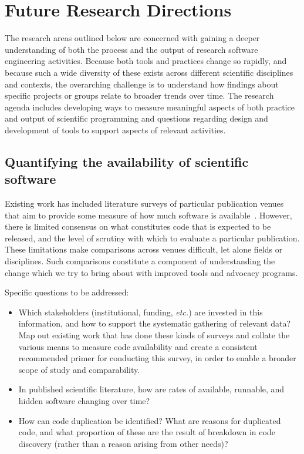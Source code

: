 \documentclass[a4paper,UKenglish]{dagman}
\newcommand{\etc}{\emph{etc.}\xspace}
\begin{document}
\newpage
\section{Future Research Directions}

The research areas outlined below are concerned with gaining a deeper understanding of both the process and the output of research software engineering activities. Because both tools and practices change so rapidly, and because such a wide diversity of these exists across different scientific disciplines and contexts, the overarching challenge is to understand how findings about specific projects or groups relate to broader trends over time. The research agenda includes developing ways to measure meaningful aspects of both practice and output of scientific programming and questions regarding design and development of tools to support aspects of relevant activities.


\subsection{Quantifying the availability of scientific software}

Existing work has included literature surveys of particular publication venues
that aim to provide some measure of how much software is available~\cite{howison_software_2015,duck_survey_2016,momcheva_software_2015}. However, there is limited consensus on what constitutes code that is expected to be released, and the level of scrutiny with which to evaluate a particular publication. These limitations make comparisons across venues difficult, let alone fields or disciplines. Such comparisons constitute a component of understanding the change which we try to bring about with improved tools and advocacy programs.

Specific questions to be addressed:
\begin{itemize}
\item Which stakeholders (institutional, funding, \etc) are invested in this information, and how to support the systematic gathering of relevant data? Map out existing work that has done these kinds of surveys and collate the various means to measure code availability and create a consistent recommended primer for conducting this survey, in order to enable a broader scope of study and comparability.
\item In published scientific literature, how are rates of available, runnable, and hidden software changing over time?
\item How can code duplication be identified? What are reasons for duplicated code, and what proportion of these are the result of breakdown in code discovery (rather than a reason arising from other needs)?
\end{itemize}
\end{document}
